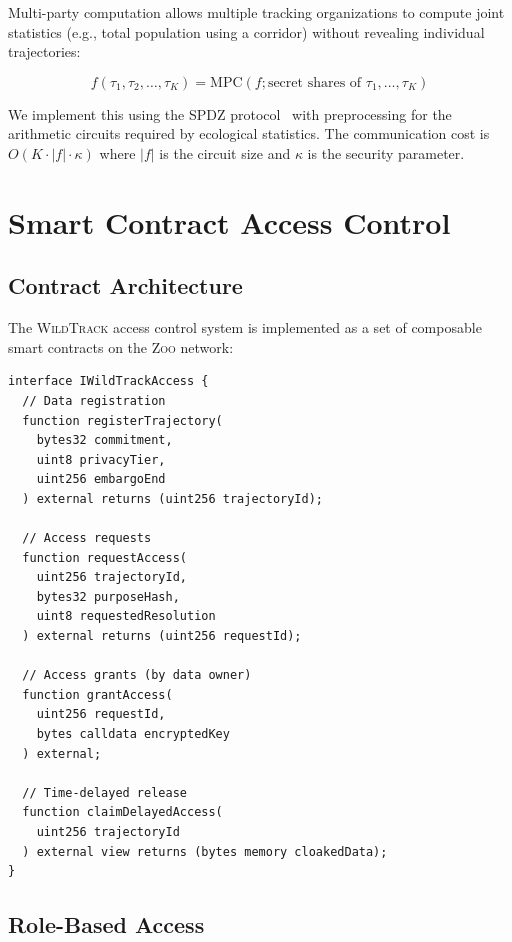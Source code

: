\documentclass[11pt,letterpaper]{article}
\newcommand{\Zoo}{\textsc{Zoo}}
\newcommand{\WildTrack}{\textsc{WildTrack}}
\begin{document}
Multi-party computation allows multiple tracking organizations to compute joint statistics (e.g., total population using a corridor) without revealing individual trajectories:

\begin{equation}
f(\tau_1, \tau_2, \ldots, \tau_K) = \text{MPC}(f; \text{secret shares of } \tau_1, \ldots, \tau_K)
\end{equation}

We implement this using the SPDZ protocol~\cite{damgard2012} with preprocessing for the arithmetic circuits required by ecological statistics. The communication cost is $O(K \cdot |f| \cdot \kappa)$ where $|f|$ is the circuit size and $\kappa$ is the security parameter.

\section{Smart Contract Access Control}

\subsection{Contract Architecture}

The \WildTrack{} access control system is implemented as a set of composable smart contracts on the \Zoo{} network:

\begin{lstlisting}[basicstyle=\footnotesize\ttfamily, frame=single, caption={WildTrack access control interface (Solidity-like pseudocode).}]
interface IWildTrackAccess {
  // Data registration
  function registerTrajectory(
    bytes32 commitment,
    uint8 privacyTier,
    uint256 embargoEnd
  ) external returns (uint256 trajectoryId);

  // Access requests
  function requestAccess(
    uint256 trajectoryId,
    bytes32 purposeHash,
    uint8 requestedResolution
  ) external returns (uint256 requestId);

  // Access grants (by data owner)
  function grantAccess(
    uint256 requestId,
    bytes calldata encryptedKey
  ) external;

  // Time-delayed release
  function claimDelayedAccess(
    uint256 trajectoryId
  ) external view returns (bytes memory cloakedData);
}
\end{lstlisting}

\subsection{Role-Based Access}
\end{document}
